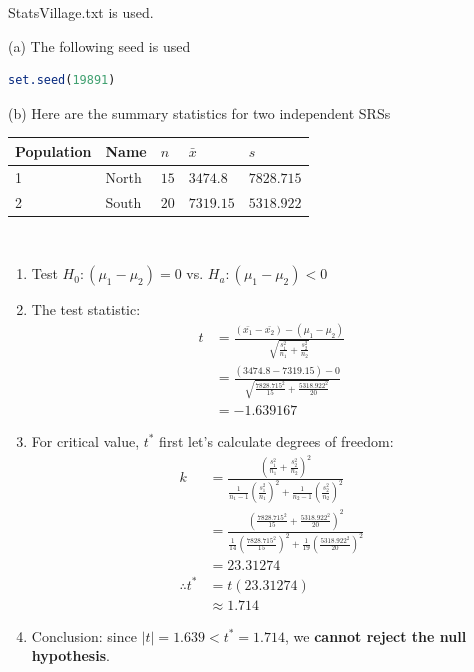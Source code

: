 \documentclass[boxes, qed]{homework}
\begin{document}
\begin{problem}StatsVillage.txt is used.
\end{problem}
\begin{solution}
  (a) The following seed is used
  \begin{lstlisting}[backgroundcolor = \color{lightgray},language = R]
    set.seed(19891)
  \end{lstlisting}

  (b) Here are the summary statistics for two independent SRSs\\

  \begin{tabular}{l|l|l|l|l}
    \hline
    Population & Name & $n$ & $\bar{x}$ & $s$ \\
    \hline
    1 & North & $15$ & $3474.8$ & $7828.715$ \\
    2 & South & $20$ & $7319.15$ & $5318.922$ \\
  \end{tabular}\\

  \begin{enumerate}
    \item Test $H_0:(\mu_1-\mu_2)=0$ vs. $H_a:(\mu_1-\mu_2)<0$
    \item The test statistic: 
      \begin{align*}
        t
        &=
        \frac{(\bar{x_1}-\bar{x_2}) - (\mu_1-\mu_2)}
        {\sqrt{
          \frac{s_1^2}{n_1}
          +\frac{s_2^2}{n_2}
        }}\\
        &=
        \frac{(3474.8-7319.15) - 0}
        {\sqrt{
          \frac{7828.715^2}{15}
          +\frac{5318.922^2}{20}
        }}\\
        &=-1.639167
      \end{align*}
    \item For critical value, $t^*$ first let's calculate degrees of freedom: 
      \begin{align*}
        k
        &=
        \frac{
          (
            \frac{s_1^2}{n_1}
            +\frac{s_2^2}{n_2}
          )^2
        }
        {
          \frac{1}{n_1-1}(\frac{s_1^2}{n_1})^2
          +\frac{1}{n_2-1}(\frac{s_2^2}{n_2})^2
        }\\
        &=
        \frac{
          (
            \frac{7828.715^2}{15}
            +\frac{5318.922^2}{20}
          )^2
        }
        {
          \frac{1}{14}(\frac{7828.715^2}{15})^2
          +\frac{1}{19}(\frac{5318.922^2}{20})^2
        }\\
        &=23.31274\\
        \therefore t^*
        &=t(23.31274)\\
        &\approx 1.714
      \end{align*}
    \item Conclusion: since $|t|=1.639<t^*=1.714$,
      we \textbf{cannot reject the null hypothesis}.
  \end{enumerate}


\end{solution}
\end{document}
